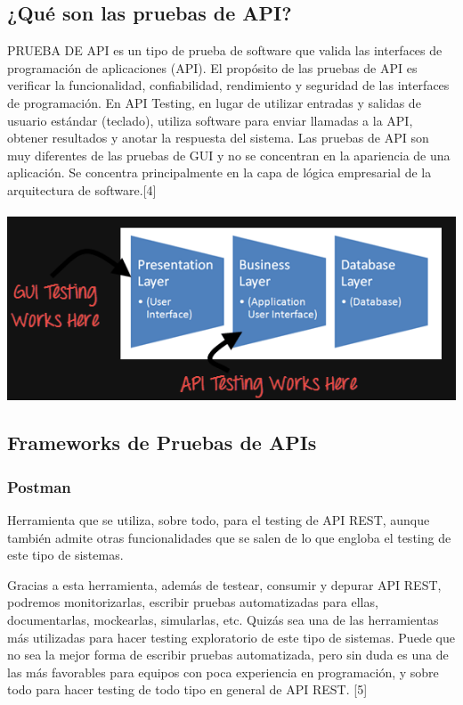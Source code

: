 \documentclass[twocolumn]{article}
\begin{document}
\subsection{¿Qué son las pruebas de API?}
PRUEBA DE API es un tipo de prueba de software que valida las interfaces de programación de 
aplicaciones (API). El propósito de las pruebas de API es verificar la funcionalidad, confiabilidad,
 rendimiento y seguridad de las interfaces de programación. En API Testing, en lugar de utilizar 
 entradas y salidas de usuario estándar (teclado), utiliza software para enviar llamadas a la API, 
 obtener resultados y anotar la respuesta del sistema. Las pruebas de API son muy diferentes de las 
 pruebas de GUI y no se concentran en la apariencia de una aplicación. Se concentra principalmente en
  la capa de lógica empresarial de la arquitectura de software.[4]\\
  \\
  \includegraphics[width=1.02\linewidth]{img/foto3}
\subsection{Frameworks de Pruebas de APIs }

\subsubsection{Postman}
Herramienta que se utiliza, sobre todo, para el testing de API REST, aunque también admite otras funcionalidades que se salen de lo que engloba el testing de este tipo de sistemas.

Gracias a esta herramienta, además de testear, consumir y depurar API REST, podremos monitorizarlas, escribir pruebas automatizadas para ellas, documentarlas, mockearlas, simularlas, etc.
\newpage
Quizás sea una de las herramientas más utilizadas para hacer testing exploratorio de este tipo de sistemas. Puede que no sea la mejor forma de escribir pruebas automatizada, pero sin duda es una de las más favorables para equipos con poca experiencia en programación, y sobre todo para hacer testing de todo tipo en general de API REST.
[5]\\
\end{document}

